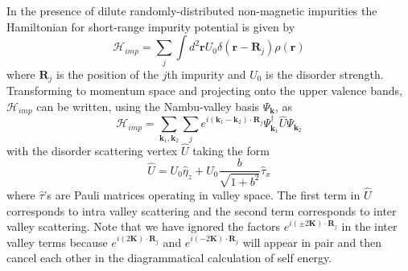 In the presence of dilute randomly-distributed non-magnetic impurities
the Hamiltonian for short-range impurity potential is given by
\begin{equation}
\mathcal{H}_{imp}=\sum_{j}\int d^{2}\mathbf{r}U_{0}\delta(\mathbf{r}-\mathbf{R}_{j})\rho(\mathbf{r})\label{eq: impurity_H_real}
\end{equation}
where $\mathbf{R}_{j}$ is the position of the $j$th impurity and
$U_{0}$ is the disorder strength. Transforming to momentum space
and projecting onto the upper valence bands, $\mathcal{H}_{imp}$
can be written, using the Nambu-valley basis $\Psi_{\mathbf{k}}$,
as
\begin{equation}
\mathcal{H}_{imp}=\sum_{\mathbf{k}_{1},\mathbf{k}_{2}}\sum_{j}e^{i(\mathbf{k}_{1}-\mathbf{k}_{2})\cdot\mathbf{R}_{j}}\Psi_{\mathbf{k}_{1}}^{\dagger}\hat{U}\Psi_{\mathbf{k}_{2}}\label{eq: impurity_H_momentum}
\end{equation}
with the disorder scattering vertex $\hat{U}$ taking the form
\begin{equation}
\hat{U}=U_{0}\hat{\eta}_{z}+U_{0}\frac{b}{\sqrt{1+b^{2}}}\hat{\tau}_{x}\label{eq: disorder_scattering_vertex}
\end{equation}
where $\hat{\tau}$'s are Pauli matrices operating in valley space.
The first term in $\hat{U}$ corresponds to intra valley scattering
and the second term corresponds to inter valley scattering. Note that
we have ignored the factors $e^{i(\pm2\mathbf{K})\cdot\mathbf{R}_{j}}$
in the inter valley terms because $e^{i(2\mathbf{K})\cdot\mathbf{R}_{j}}$
and $e^{i(-2\mathbf{K})\cdot\mathbf{R}_{j}}$ will appear in pair
and then cancel each other in the diagrammatical calculation of self
energy.

